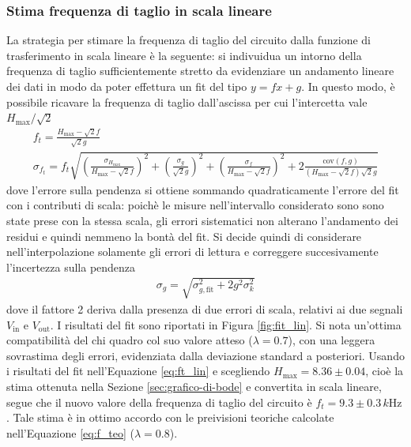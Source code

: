 \documentclass[a4paper,11pt]{article}
\begin{document}
\subsubsection{Stima frequenza di taglio in scala lineare}
\label{sec:stima-frequenza-di}

La strategia per stimare la frequenza di taglio del circuito dalla
funzione di trasferimento in scala lineare è la seguente:
si indivuidua un intorno della frequenza di taglio
sufficientemente stretto da evidenziare un andamento lineare dei dati in modo
da poter effettura un fit del tipo $y= fx + g$. In questo modo, è possibile
ricavare la frequenza di taglio dall'ascissa per cui l'intercetta vale
$H_{\text{max}}/\sqrt 2$
\begin{gather}
  \label{eq:ft_lin}
  f_{t} = \frac{H_{\text{max}} - \sqrt2 f}{\sqrt2 g}\\ 
  \sigma_{f_{t}} = f_t\sqrt{  \left( \frac{\sigma_{H_{\text{max}}}}{H_{\text{max}}-\sqrt2 f}\right)^2 + 
	  \left( \frac{\sigma_g}{\sqrt2 g}\right)^2 + 
	  \left( \frac{\sigma_f}{H_{\text{max}}-\sqrt2 f}\right)^2 + 
  2 \frac{\text{cov}(f,g)}{(H_\text{max}-\sqrt2 f)\sqrt 2 g}}
\end{gather}
dove l'errore sulla pendenza si ottiene sommando quadraticamente l'errore
del fit con i contributi di scala: poichè le misure nell'intervallo considerato
sono sono state prese con la stessa scala, gli errori sistematici
non alterano l'andamento dei residui e quindi nemmeno la bontà del fit.
Si decide quindi di considerare nell'interpolazione solamente gli errori di
lettura e correggere succesivamente l'incertezza sulla pendenza 
\begin{align}
	\sigma_{g}=\sqrt{\sigma_{g,\text{fit}}^2 + 2 g^2 \sigma_k^2 }
\end{align}
dove il fattore 2 deriva dalla presenza di due errori di scala, relativi ai due
segnali $V_{\text{in}}$ e $V_{\text{out}}$.
I risultati del fit sono riportati in Figura \ref{fig:fit_lin}. Si nota un'ottima compatibilità del chi quadro col suo valore atteso ($\lambda=0.7$), con una leggera sovrastima degli errori, evidenziata dalla deviazione standard a posteriori. Usando i risultati del fit nell'Equazione \ref{eq:ft_lin} e scegliendo $H_{\text{max}} = 8.36\pm 0.04$, cioè la stima ottenuta nella Sezione \ref{sec:grafico-di-bode} e convertita in scala lineare, segue che il nuovo valore della frequenza di taglio del circuito è $f_t=9.3 \pm 0.3 \,\si{k\Hz}$. Tale
stima è in ottimo accordo con le preivisioni teoriche calcolate nell'Equazione \ref{eq:f_teo} ($\lambda=0.8$).
\end{document}
